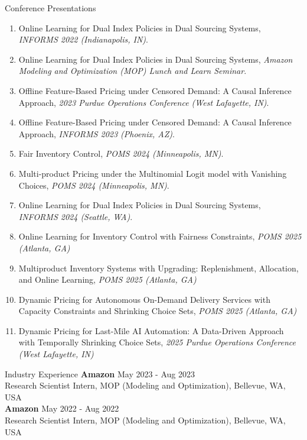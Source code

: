 \documentclass{resume}
\begin{document}
\begin{rSection}{Conference Presentations}
\begin{enumerate}
  \item Online Learning for Dual Index Policies in Dual Sourcing Systems, \textit{INFORMS 2022 (Indianapolis, IN)}.
  \item Online Learning for Dual Index Policies in Dual Sourcing Systems, \textit{Amazon Modeling and Optimization (MOP) Lunch and Learn Seminar}.
  \item Offline Feature-Based Pricing under Censored Demand: A Causal Inference Approach, \textit{2023 Purdue Operations Conference (West Lafayette, IN)}. 
  \item Offline Feature-Based Pricing under Censored Demand: A Causal Inference Approach, \textit{INFORMS 2023 (Phoenix, AZ)}. 
  \item Fair Inventory Control, \textit{POMS 2024 (Minneapolis, MN)}. 
  \item Multi-product Pricing under the Multinomial Logit model with Vanishing Choices, \textit{POMS 2024 (Minneapolis, MN)}. 
  \item Online Learning for Dual Index Policies in Dual Sourcing Systems, \textit{INFORMS 2024 (Seattle, WA)}. 
  \item Online Learning for Inventory Control with Fairness Constraints, \textit{POMS 2025 (Atlanta, GA)}
  \item Multiproduct Inventory Systems with Upgrading: Replenishment, Allocation, and Online Learning, \textit{POMS 2025 (Atlanta, GA)}
  \item Dynamic Pricing for Autonomous On-Demand Delivery Services with Capacity Constraints and Shrinking Choice Sets, \textit{POMS 2025 (Atlanta, GA)}
  \item Dynamic Pricing for Last-Mile AI Automation: 
A Data-Driven Approach with Temporally Shrinking Choice Sets, \textit{2025 Purdue Operations Conference (West Lafayette, IN)}
\end{enumerate}
\end{rSection}

\begin{rSection}{Industry Experience}
 {\bf Amazon} \hfill {May 2023 - Aug 2023}\\
 {Research Scientist Intern, MOP (Modeling and Optimization), Bellevue, WA, USA}\\
 {\bf Amazon} \hfill {May 2022 - Aug 2022}\\
 {Research Scientist Intern, MOP (Modeling and Optimization), Bellevue, WA, USA}
\end{rSection}
\end{document}
